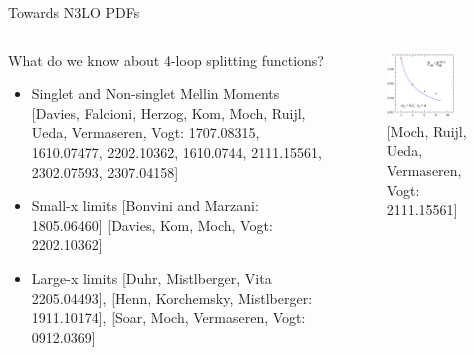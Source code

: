 \documentclass[aspectratio=169, 8pt,t]{beamer}
\begin{document}
\begin{frame}{Towards N3LO PDFs}
\begin{columns}[T]
\begin{column}{0.59\textwidth}
      \vspace*{1em}
      What do we know about 4-loop splitting functions?
      \begin{itemize}
        \item Singlet and Non-singlet Mellin Moments
        {\color{gray}\small [Davies, Falcioni, Herzog, Kom, Moch, Ruijl, Ueda, Vermaseren, Vogt: 1707.08315, 1610.07477, 2202.10362, 1610.0744, 2111.15561, 2302.07593, 2307.04158]}
        \item Small-x limits {\color{gray}\small [Bonvini and Marzani: 1805.06460] [Davies, Kom, Moch, Vogt: 2202.10362]}
        \item Large-x limits {\color{gray}\small [Duhr, Mistlberger, Vita 2205.04493], [Henn, Korchemsky, Mistlberger: 1911.10174], [Soar, Moch, Vermaseren, Vogt: 0912.0369]}
      \end{itemize}
    \end{column}
    \begin{column}{0.39\textwidth}
      \begin{figure}
        \includegraphics[width=0.8\textwidth]{figures/splittingmoments.png}
        \caption*{\color{gray}\small[Moch, Ruijl, Ueda, Vermaseren, Vogt: 2111.15561]}
      \end{figure}
    \end{column}
  \end{columns}


\end{frame}
\end{document}
